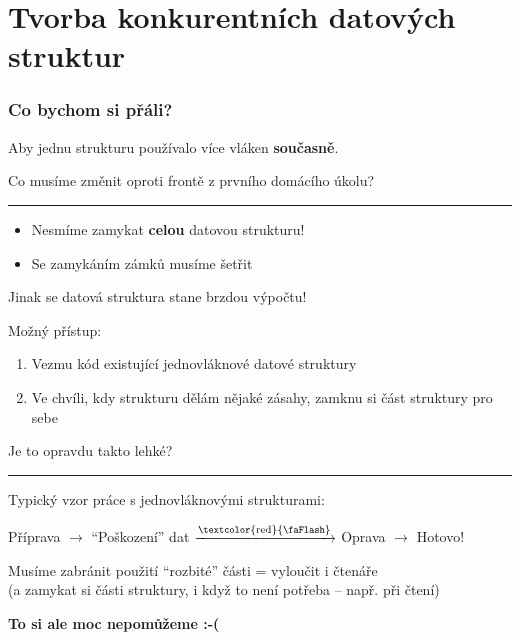 \documentclass[usenames,dvipsnames,9pt]{beamer}
\begin{document}
\section{Tvorba konkurentních datových struktur}

\begin{frame}
\frametitle{Co bychom si přáli?}

Aby jednu strukturu používalo více vláken {\bf současně}.

  \begin{center}
    \Large Co musíme změnit oproti frontě z prvního domácího úkolu?
  \end{center}
  
\pause\vspace{1em}\hrule\vspace{1em}

\begin{itemize}
  \item Nesmíme zamykat \textbf{celou} datovou strukturu!
  \item Se zamykáním zámků musíme šetřit
\end{itemize}

\vspace{1em}\hfill\faWarning \hspace{2pt} Jinak se datová struktura stane brzdou výpočtu!

\end{frame}

\begin{frame}
  Možný přístup:
  \begin{enumerate}
    \item Vezmu kód existující jednovláknové datové struktury
    \item Ve chvíli, kdy strukturu dělám nějaké zásahy, zamknu si část struktury pro sebe
  \end{enumerate}
  \begin{center}
    \Large Je to opravdu takto lehké?
  \end{center}
  \pause\vspace{1em}\hrule\vspace{1em}
  Typický vzor práce s jednovláknovými strukturami:
  \begin{center}
    Příprava $\rightarrow$ ``Poškození'' dat $\xrightarrow{\text{\textcolor{red}{\faFlash}}}$ Oprava $\rightarrow$ Hotovo!
  \end{center}

  \pause\vspace{1em}
  Musíme zabránit použití ``rozbité'' části = vyloučit i čtenáře\\
  (a zamykat si části struktury, i když to není potřeba -- např. při čtení)

  \pause\vspace{1.5em}

  \hfill \large\bf To si ale moc nepomůžeme :-(
\end{frame}
\end{document}
